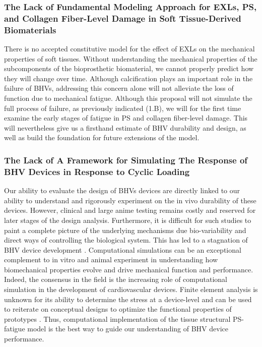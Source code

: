 \subsubsection{The Lack of Fundamental Modeling Approach for EXLs, PS, and Collagen Fiber-Level Damage in Soft Tissue-Derived Biomaterials}

    There is no accepted constitutive model for the effect of EXLs on the mechanical properties of soft tissues. Without understanding the mechanical properties of the subcomponents of the bioprosthetic biomaterial, we cannot properly predict how they will change over time. Although calcification plays an important role in the failure of BHVs, addressing this concern alone will not alleviate the loss of function due to mechanical fatigue. Although this proposal will not simulate the full process of failure, as previously indicated (1.B), we will for the first time examine the early stages of fatigue in PS and collagen fiber-level damage. This will nevertheless give us a firsthand estimate of BHV durability and design, as well as build the foundation for future extensions of the model.

\subsubsection{The Lack of A Framework for Simulating The Response of BHV Devices in Response to Cyclic Loading}

    Our ability to evaluate the design of BHVs devices are directly linked to our ability to understand and rigorously experiment on the in vivo durability of these devices. However, clinical and large anime testing remains costly and reserved for later stages of the design analysis. Furthermore, it is difficult for such studies to paint a complete picture of the underlying mechanisms due bio-variability and direct ways of controlling the biological system. This has led to a stagnation of BHV device development \cite{schoen_cardiac_2005}. Computational simulations can be an exceptional complement to in vitro and animal experiment in understanding how biomechanical properties evolve and drive mechanical function and performance. Indeed, the consensus in the field is the increasing role of computational simulation in the development of cardiovascular devices. Finite element analysis is unknown for its ability to determine the stress at a device-level and can be used to reiterate on conceptual designs to optimize the functional properties of prototypes \cite{patterson_comparative_1996,huang_two_1990,black_three_1991}. Thus, computational implementation of the tissue structural PS-fatigue model is the best way to guide our understanding of BHV device performance.

